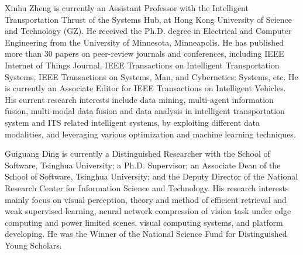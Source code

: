 \documentclass[lettersize,journal]{IEEEtran}
\begin{document}
\begin{IEEEbiography}{Xinhu Zheng} is currently an Assistant Professor with the Intelligent Transportation Thrust of the Systems Hub, at Hong Kong University of Science and Technology (GZ). He received the Ph.D. degree in Electrical and Computer Engineering from the University of Minnesota, Minneapolis. He has published more than 30 papers on peer-review journals and conferences, including IEEE Internet of Things Journal, IEEE Transactions on Intelligent Transportation Systems, IEEE Transactions on Systems, Man, and Cybernetics: Systems, etc. He is currently an Associate Editor for IEEE Transactions on Intelligent Vehicles. His current research interests include data mining, multi-agent information fusion, multi-modal data fusion and data analysis in intelligent transportation system and ITS related intelligent systems, by exploiting different data modalities, and leveraging various optimization and machine learning techniques.
\end{IEEEbiography}

\begin{IEEEbiography}{Guiguang Ding} is currently a Distinguished Researcher with the School of Software, Tsinghua University; a Ph.D. Supervisor; an Associate Dean of the School of Software, Tsinghua University; and the Deputy Director of the National Research Center for Information Science and Technology. His research interests mainly focus on visual perception, theory and method of efficient retrieval and weak supervised learning, neural network compression of vision task under edge computing and power limited scenes, visual computing systems, and platform developing. He was the Winner of the National Science Fund for Distinguished Young Scholars.
\end{IEEEbiography}
\end{document}
